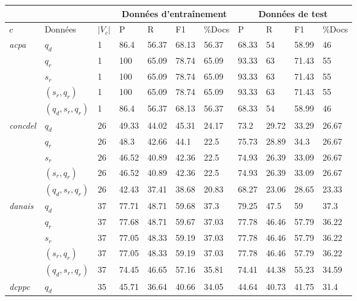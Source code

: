 \begin{table}[!htb]
	\centering \scriptsize
	\begin{tabular}{l|l|l|llll|llll}
			\hline\noalign{\smallskip}
		&                 &                       &          \multicolumn{4}{|c|}{Données d'entraînement}      &      \multicolumn{4}{|c}{Données de test}       \\ \hline
		$c$ & Données & $\vert V_c \vert$ & P     & R     & F1                       & \%Docs & P     & R     & F1              & \%Docs \\ \hline
		\multirow{5}{*}{\textit{acpa}}  & $q_d$ & 1 & 86.4 & 56.37 & 68.13 & 56.37 & 68.33 & 54 & 58.99 & 46 \\
		& $q_r$ & 1 & 100 & 65.09 & 78.74 & 65.09 & 93.33 & 63 & 71.43 & 55 \\
		& $s_r$ & 1 & 100 & 65.09 & 78.74 & 65.09 & 93.33 & 63 & 71.43 & 55 \\
		& $(s_r, q_r)$ & 1 & 100 & 65.09 & 78.74 & 65.09 & 93.33 & 63 & 71.43 & 55 \\
		& $(q_d,s_r, q_r)$ & 1 & 86.4 & 56.37 & 68.13 & 56.37 & 68.33 & 54 & 58.99 & 46 \\ \hline
		\multirow{5}{*}{\textit{concdel}}  & $q_d$ & 26 & 49.33 & 44.02 & 45.31 & 24.17 & 73.2 & 29.72 & 33.29 & 26.67 \\
		& $q_r$ & 26 & 48.3 & 42.66 & 44.1 & 22.5 & 75.73 & 28.89 & 34.3 & 26.67 \\
		& $s_r$ & 26 & 46.52 & 40.89 & 42.36 & 22.5 & 74.93 & 26.39 & 33.09 & 26.67 \\
		& $(s_r, q_r)$ & 26 & 46.52 & 40.89 & 42.36 & 22.5 & 74.93 & 26.39 & 33.09 & 26.67 \\
		& $(q_d,s_r, q_r)$ & 26 & 42.43 & 37.41 & 38.68 & 20.83 & 68.27 & 23.06 & 28.65 & 23.33 \\ \hline
		\multirow{5}{*}{\textit{danais}} & $q_d$ & 37 & 77.71 & 48.71 & 59.68 & 37.3 & 79.25 & 47.5 & 59 & 37.3 \\
		& $q_r$ & 37 & 77.68 & 48.71 & 59.67 & 37.03 & 77.78 & 46.46 & 57.79 & 36.22 \\
		& $s_r$ & 37 & 77.05 & 48.33 & 59.19 & 37.03 & 77.78 & 46.46 & 57.79 & 36.22 \\
		& $(s_r, q_r)$ & 37 & 77.05 & 48.33 & 59.19 & 37.03 & 77.78 & 46.46 & 57.79 & 36.22 \\
		& $(q_d,s_r, q_r)$ & 37 & 74.45 & 46.65 & 57.16 & 35.81 & 74.41 & 44.38 & 55.23 & 34.59 \\ \hline
		\multirow{5}{*}{\textit{dcppc}}   & $q_d$ & 35 & 45.71 & 36.64 & 40.66 & 34.05 & 44.64 & 40.73 & 41.75 & 31.4 \\

\end{tabular}
\end{table}
